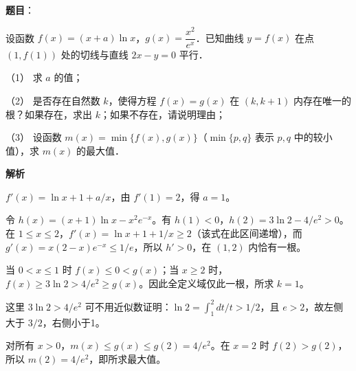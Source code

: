 \begin{answer}

\textbf{题目}：

设函数 \(f(x)=(x+a)\ln x\)，\(g(x)=\dfrac{x^2}{e^x}\)．已知曲线 \(y=f(x)\) 在点 \((1,f(1))\) 处的切线与直线 \(2x-y=0\) 平行．

（1） 求 \(a\) 的值；

（2） 是否存在自然数 \(k\)，使得方程 \(f(x)=g(x)\) 在 \((k,k+1)\) 内存在唯一的根？如果存在，求出 \(k\)；如果不存在，请说明理由；

（3） 设函数 \(m(x)=\min\{f(x),g(x)\}\)（\(\min\{p,q\}\) 表示 \(p,q\) 中的较小值），求 \(m(x)\) 的最大值．

\textbf{解析}


\(f'(x)=\ln x+1+a/x\)，由 \(f'(1)=2\)，得 \(a=1\)。


令 \(h(x)=(x+1)\ln x-x^2e^{-x}\)。有 \(h(1)<0\)，\(h(2)=3\ln2-4/e^2>0\)。在 \(1\leqslant x\leqslant2\)，\(f'(x)=\ln x+1+1/x\geqslant2\)（该式在此区间递增），而 \(g'(x)=x(2-x)e^{-x}\leqslant1/e\)，所以 \(h'>0\)，在 \((1,2)\) 内恰有一根。

当 \(0<x\leqslant1\) 时 \(f(x)\leqslant0<g(x)\)；当 \(x\geqslant2\) 时，\(f(x)\geqslant3\ln2>4/e^2\geqslant g(x)\)。因此全定义域仅此一根，所求 \(k=1\)。

这里 \(3\ln2>4/e^2\) 可不用近似数证明：\(\ln2=\int_1^2dt/t>1/2\)，且 \(e>2\)，故左侧大于 \(3/2\)，右侧小于1。


对所有 \(x>0\)，\(m(x)\leqslant g(x)\leqslant g(2)=4/e^2\)。在 \(x=2\) 时 \(f(2)>g(2)\)，所以 \(m(2)=4/e^2\)，即所求最大值。




\end{answer}
